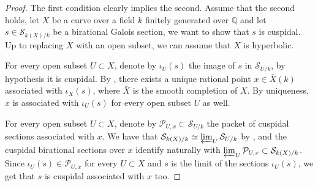 \documentclass[11pt]{amsart}
\theoremstyle{plain}
\theoremstyle{definition}
\newcommand{\1}{\mathbb{1}}
\newcommand{\mc}{\mathcal}
\newcommand{\Q}{\mathbb{Q}}
\renewcommand{\projlim}{\varprojlim}
\begin{document}
\begin{proof}
    The first condition clearly implies the second. Assume that the second holds, let $X$ be a curve over a field $k$ finitely generated over $\Q$ and let $s\in\mc{S}_{k(X)/k}$ be a birational Galois section, we want to show that $s$ is cuspidal. Up to replacing $X$ with an open subset, we can assume that $X$ is hyperbolic.
    
    For every open subset $U\subset X$, denote by $\iota_{U}(s)$ the image of $s$ in $\mc{S}_{U/k}$, by hypothesis it is cuspidal. By \cite[Theorem 17 (2)]{sti12}, there exists a unique rational point $x\in\bar{X}(k)$ associated with $\iota_{X}(s)$, where $\bar{X}$ is the smooth completion of $X$. By uniqueness, $x$ is associated with $\iota_{U}(s)$ for every open subset $U$ as well.
    
    For every open subset $U\subset X$, denote by $\mc{P}_{U,x}\subset\mc{S}_{U/k}$ the packet of cuspidal sections associated with $x$. We have that $\mc{S}_{k(X)/k}\simeq\projlim_{U}\mc{S}_{U/k}$ by \cite[Lemma 259]{sti13}, and the cuspidal birational sections over $x$ identify naturally with $\projlim_{U}\mc{P}_{U,x}\subset\mc{S}_{k(X)/k}$. Since $\iota_{U}(s)\in\mc{P}_{U,x}$ for every $U\subset X$ and $s$ is the limit of the sections $\iota_{U}(s)$, we get that $s$ is cuspidal associated with $x$ too.
\end{proof}
\end{document}
